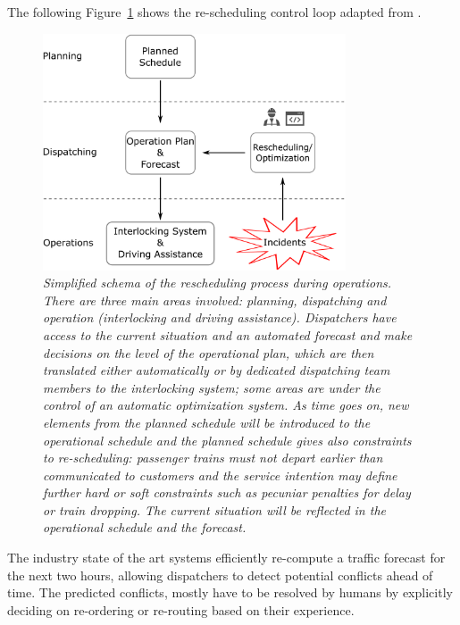 \documentclass{article}
\begin{document}
The following Figure~\ref{fig:introduction_operations} shows the re-scheduling control loop adapted from \cite{rcsbrochure,rcswhitepaper}.
%
\begin{figure}[hbtp]
	\centering
  \includegraphics[width=0.8\textwidth]{Figures/rescheduling_schema_heute.pdf}
	\caption{\textit{Simplified schema of the rescheduling process during operations. There are three main areas involved: \emph{planning}, \emph{dispatching} and \emph{operation} (interlocking and driving assistance). Dispatchers have access to the current situation and an automated forecast and make decisions on the level of the operational plan, which are then translated either automatically or by dedicated dispatching team members to the interlocking system; some areas are under the control of an automatic optimization system. As time goes on, new elements from the planned schedule will be introduced to the operational schedule and the planned schedule gives also constraints to re-scheduling: passenger trains must not depart earlier than communicated to customers and the service intention may define further hard or soft constraints such as pecuniar penalties for delay or train dropping. The current situation will be reflected in the operational schedule and the forecast.}}
	\label{fig:introduction_operations}
\end{figure}
%


The industry state of the art systems efficiently re-compute a traffic forecast for the next two hours, allowing dispatchers to detect potential conflicts ahead of time. The predicted conflicts, mostly have to be resolved by humans by explicitly deciding on re-ordering or re-routing based on their experience.
\end{document}
